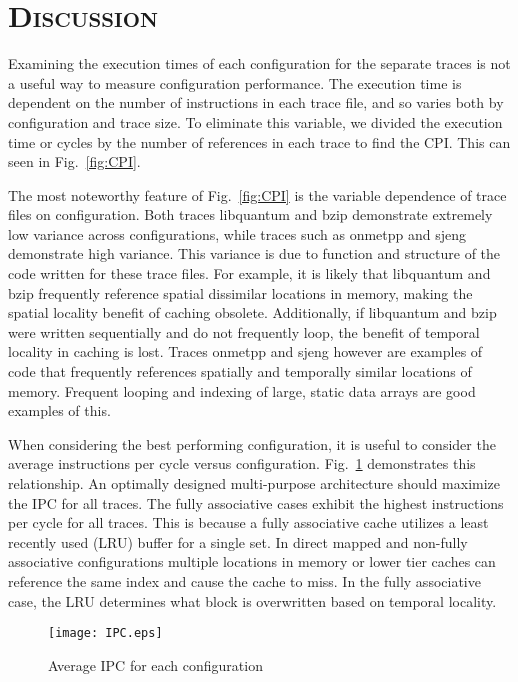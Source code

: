 \documentclass[FinalReport.tex]{subfiles}
\begin{document}
\bigskip

\section*{\textsc{\Large Discussion}}
 Examining the execution times of each configuration for the separate traces is not a useful way to measure configuration performance.  The execution time is dependent on the number of instructions in each trace file, and so varies both by configuration and trace size.  To eliminate this variable, we divided the execution time or cycles by the number of references in each trace to find the CPI.  This can seen in Fig.~\ref{fig:CPI}.
 
	The most noteworthy feature of Fig.~\ref{fig:CPI} is the variable dependence of trace files on configuration.  Both traces libquantum and bzip demonstrate extremely low variance across configurations, while traces such as onmetpp and sjeng demonstrate high variance. This variance is due to function and structure of the code written for these trace files. For example, it is likely that libquantum and bzip frequently reference spatial dissimilar locations in memory, making the spatial locality benefit of caching obsolete. Additionally, if libquantum and bzip were written sequentially and do not frequently loop, the benefit of temporal locality in caching is lost. Traces onmetpp and sjeng however are examples of code that frequently references spatially and temporally similar locations of memory. Frequent looping and indexing of large, static data arrays are good examples of this.
	
	 When considering the best performing configuration, it is useful to consider the average instructions per cycle versus configuration. Fig.~\ref{fig:IPC} demonstrates this relationship. An optimally designed multi-purpose architecture should maximize the IPC for all traces. The fully associative cases exhibit the highest instructions per cycle for all traces. This is because a fully associative cache utilizes a least recently used (LRU) buffer for a single set. In direct mapped and non-fully associative configurations multiple locations in memory or lower tier caches can reference the same index and cause the cache to miss.  In the fully associative case, the LRU determines what block is overwritten based on temporal locality.  

\begin{figure}[H]
\centering
\texttt{[image: IPC.eps]}
\caption{Average IPC for each configuration\label{fig:IPC}}
\end{figure}
\end{document}
